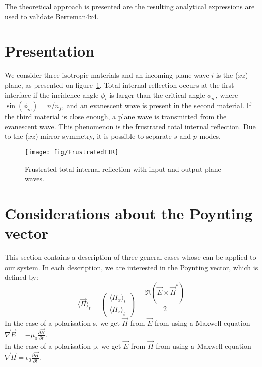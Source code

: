 

The theoretical approach is presented are the resulting analytical expressions are used to validate Berreman4x4.

\section{Presentation}

We consider three isotropic materials and an incoming plane wave $i$ is the ($xz$) plane, as presented on figure~\ref{fig:FTIR}.
Total internal reflection occurs at the first interface if the incidence angle $\phi_i$ is larger than the critical angle $\phi_{ic}$, where $\sin(\phi_{ic}) = n/n_f$, and an evanescent wave is present in the second material.
If the third material is close enough, a plane wave is transmitted from the evanescent wave.
This phenomenon is the frustrated total internal reflection. 
Due to the ($xz$) mirror symmetry, it is possible to separate $s$ and $p$ modes.

\begin{figure}[!h]
\texttt{[image: fig/FrustratedTIR]}
\caption{\label{fig:FTIR}Frustrated total internal reflection with input and output plane waves. }
\end{figure}

\section{Considerations about the Poynting vector}
This section contains a description of three general cases whose can be applied to our system. In each description, we are interested in the Poynting vector, which is defined by:
$$\langle \vec{\Pi} \rangle _t = \begin{pmatrix}
\langle \Pi _x \rangle _t\\
\langle \Pi _z \rangle _t
\end{pmatrix}
=\frac{\Re(\vec{E}\times \vec{H}^*)}{2} $$
In the case of a polarisation s, we get $\vec{H}$ from $\vec{E}$ from using a Maxwell equation
$\vec{\nabla}\vec{E} = -\mu_0 \frac{\partial\vec{H}}{\partial t}$.\\
In the case of a polarisation p, we get $\vec{E}$ from $\vec{H}$ from using a Maxwell equation $\vec{\nabla}\vec{H}=\epsilon_0\frac{\partial\vec{H}}{\partial t}$.\\



